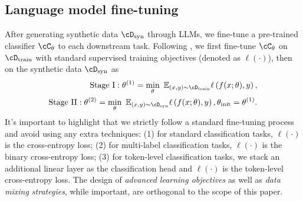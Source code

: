 \subsection{Language model fine-tuning}
After generating synthetic data $\cD_{\text{syn}}$ through LLMs, we fine-tune a pre-trained classifier $\cC_{\theta}$ to each downstream task. Following \citep{meng2023tuning}, we first fine-tune $\cC_{\theta}$ on $\cD_{\text{train}}$ with standard supervised training objectives (denoted as $\ell(\cdot)$), then on the synthetic data $\cD_{\text{syn}}$ as  
\begin{align}
    \label{eq:stage1}
    \mathrm{Stage~I}: \theta^{(1)} = \min_{\theta}~\mathbb{E}_{(x, y) \sim \cD_{\text{train}}} \ell\left( f(x; \theta), y \right), \\
    \mathrm{Stage~II}: \theta^{(2)} =  \min_{\theta}~\mathbb{E}_{(x, y) \sim \cD_{\text{syn}}} \ell\left( f(x; \theta), y \right),  \theta_{\text{init}} = \theta^{(1)}.
\end{align} 
It's important to highlight that we strictly follow a standard fine-tuning process and avoid using any extra techniques: (1) for standard classification tasks, $\ell(\cdot)$ is the cross-entropy loss; (2) for multi-label classification tasks, $\ell(\cdot)$ is the binary cross-entropy loss; 
(3) for token-level classification tasks, we stack an additional linear layer as the classification head and  $\ell(\cdot)$ is the token-level cross-entropy loss. 
The design of \emph{advanced learning objectives} as well as \emph{data mixing strategies}, while important, are orthogonal to the scope of this paper. 







